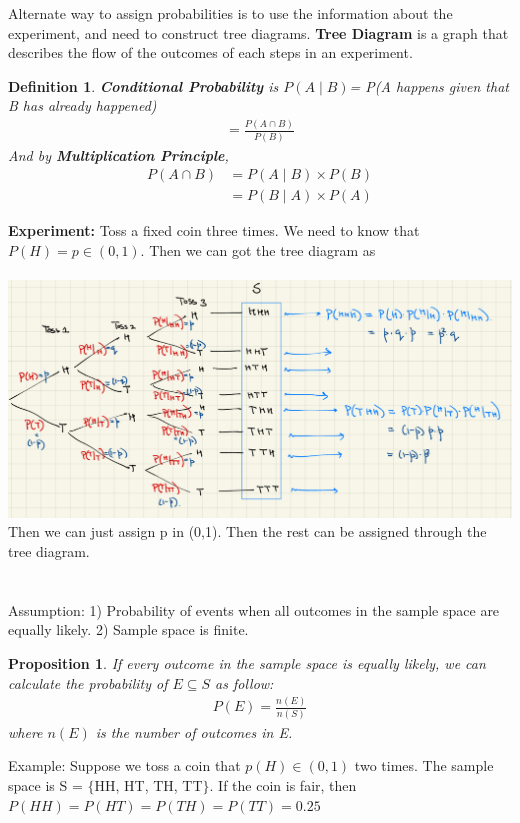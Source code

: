 \documentclass[11pt,oneside]{book}
\theoremstyle{break}
\theoremstyle{break}
\newtheorem{prop}[lem]{Proposition}
\newtheorem{defn}{Definition}[corL]
\newcommand{\example}{\color{WildStrawberry}Example: \color{black}}
\begin{document}
	Alternate way to assign probabilities is to use the information about the experiment, and need to construct tree diagrams. 
	\textbf{Tree Diagram} is a graph that describes the flow of the outcomes of each steps in an experiment. 
	\begin{defn}
	\textbf{Conditional Probability} is $P(A\mid B)$= P(A happens given that B has already happened)\begin{align*}
	=\frac{P(A\cap B)}{P(B)}
	\end{align*}
	And by \textbf{Multiplication Principle}, \begin{align*}
	P(A\cap B) & = P(A\mid B) \times P(B)\\
	&= P(B\mid A)\times P(A)
	\end{align*}
	\end{defn}
	\textbf{Experiment:} Toss a fixed coin three times. We need to know that $P(H)=p\in (0,1)$. Then we can got the tree diagram as\\
	\hfill\\
	 \includegraphics[scale=0.35]{figures/graph}\\
	 Then we can just assign p in (0,1). Then the rest can be assigned through the tree diagram.\\
\hfill\\
\hfill\\
	Assumption: 1) Probability of events when all outcomes in the sample space are equally likely. 2) Sample space is finite.
	\begin{prop}
	If every outcome in the sample space is equally likely, we can calculate the probability of $E\subseteq S$ as follow: \begin{align*}
	P(E)=\frac{n(E)}{n(S)}
	\end{align*}
	where $n(E)$ is the number of outcomes in E. 
	\end{prop}
	\example Suppose we toss a coin that $p(H)\in (0,1)$ two times. The sample space is S = $\{$HH, HT, TH, TT$\}$. If the coin is fair, then $P(HH)=P(HT)=P(TH)=P(TT)=0.25$\\
\end{document}
